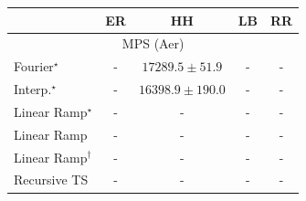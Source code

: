 \begin{tabular}{l|cccc|}
\toprule
            & ER & HH & LB & RR \\
\midrule
\multicolumn{5}{c}{\rule{0pt}{8pt}MPS (Aer)} \\
\midrule
Fourier$^\star$ & {\cellcolor[HTML]{000000}} \color[HTML]{F1F1F1} {\cellcolor{white}} \color{black} - & {\cellcolor[HTML]{4D004B}} \color[HTML]{F1F1F1} $17289.5\pm 51.9$ & {\cellcolor[HTML]{000000}} \color[HTML]{F1F1F1} {\cellcolor{white}} \color{black} - & {\cellcolor[HTML]{000000}} \color[HTML]{F1F1F1} {\cellcolor{white}} \color{black} - \\
Interp.$^\star$ & {\cellcolor[HTML]{000000}} \color[HTML]{F1F1F1} {\cellcolor{white}} \color{black} - & {\cellcolor[HTML]{F7FCFD}} \color[HTML]{000000} $16398.9\pm 190.0$ & {\cellcolor[HTML]{000000}} \color[HTML]{F1F1F1} {\cellcolor{white}} \color{black} - & {\cellcolor[HTML]{000000}} \color[HTML]{F1F1F1} {\cellcolor{white}} \color{black} - \\
Linear Ramp$^\star$ & {\cellcolor[HTML]{000000}} \color[HTML]{F1F1F1} {\cellcolor{white}} \color{black} - & {\cellcolor[HTML]{000000}} \color[HTML]{F1F1F1} {\cellcolor{white}} \color{black} - & {\cellcolor[HTML]{000000}} \color[HTML]{F1F1F1} {\cellcolor{white}} \color{black} - & {\cellcolor[HTML]{000000}} \color[HTML]{F1F1F1} {\cellcolor{white}} \color{black} - \\
Linear Ramp & {\cellcolor[HTML]{000000}} \color[HTML]{F1F1F1} {\cellcolor{white}} \color{black} - & {\cellcolor[HTML]{000000}} \color[HTML]{F1F1F1} {\cellcolor{white}} \color{black} - & {\cellcolor[HTML]{000000}} \color[HTML]{F1F1F1} {\cellcolor{white}} \color{black} - & {\cellcolor[HTML]{000000}} \color[HTML]{F1F1F1} {\cellcolor{white}} \color{black} - \\
Linear Ramp$^\dagger$ & {\cellcolor[HTML]{000000}} \color[HTML]{F1F1F1} {\cellcolor{white}} \color{black} - & {\cellcolor[HTML]{000000}} \color[HTML]{F1F1F1} {\cellcolor{white}} \color{black} - & {\cellcolor[HTML]{000000}} \color[HTML]{F1F1F1} {\cellcolor{white}} \color{black} - & {\cellcolor[HTML]{000000}} \color[HTML]{F1F1F1} {\cellcolor{white}} \color{black} - \\
Recursive TS & {\cellcolor[HTML]{000000}} \color[HTML]{F1F1F1} {\cellcolor{white}} \color{black} - & {\cellcolor[HTML]{000000}} \color[HTML]{F1F1F1} {\cellcolor{white}} \color{black} - & {\cellcolor[HTML]{000000}} \color[HTML]{F1F1F1} {\cellcolor{white}} \color{black} - & {\cellcolor[HTML]{000000}} \color[HTML]{F1F1F1} {\cellcolor{white}} \color{black} - \\

\end{tabular}
